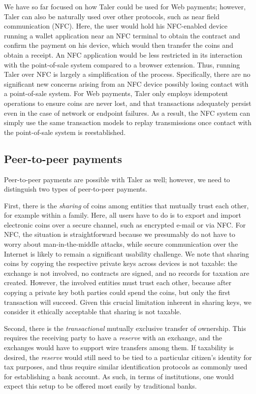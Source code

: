 \documentclass{llncs}
\begin{document}
We have so far focused on how Taler could be used for Web payments;
however, Taler can also be naturally used over other protocols, such
as near field communication (NFC).  Here, the user would hold his
NFC-enabled device running a wallet application near an NFC terminal
to obtain the contract and confirm the payment on his device, which
would then transfer the coins and obtain a receipt.  An NFC
application would be less restricted in its interaction with the
point-of-sale system compared to a browser extension. Thus, running
Taler over NFC is largely a simplification of the process.
Specifically, there are no significant new concerns arising from an
NFC device possibly losing contact with a point-of-sale system.
For Web payments, Taler only employs idempotent operations to
ensure coins are never lost, and that transactions adequately persist
even in the case of network or endpoint failures.  As a result, the
NFC system can simply use the same transaction models to replay
transmissions once contact with the point-of-sale system is
reestablished.


\subsection{Peer-to-peer payments}

Peer-to-peer payments are possible with Taler as well; however,
we need to distinguish two types of peer-to-peer payments.

First, there is the {\em sharing} of coins among entities that
mutually trust each other, for example within a family.  Here, all
users have to do is to export and import electronic coins over a
secure channel, such as encrypted e-mail or via NFC.  For NFC, the
situation is straightforward because we presumably do not have to worry
about man-in-the-middle attacks, while secure communication over the
Internet is likely to remain a significant usability challenge.  We
note that sharing coins by copying the respective private keys across
devices is not taxable: the exchange is not involved, no contracts are
signed, and no records for taxation are created.  However, the
involved entities must trust each other, because after copying a private
key both parties could spend the coins, but only the first transaction
will succeed.  Given this crucial limitation
inherent in sharing keys, we consider it ethically acceptable that
sharing is not taxable.

Second, there is the {\em transactional} mutually exclusive transfer
of ownership.  This requires the receiving party to have a {\em
reserve} with an exchange, and the exchanges would have to support
wire transfers among them.  If taxability is desired, the {\em
reserve} would still need to be tied to a particular citizen's
identity for tax purposes, and thus require similar identification
protocols as commonly used for establishing a bank account.  As such, in
terms of institutions, one would expect this setup to be offered most
easily by traditional banks.
\end{document}
